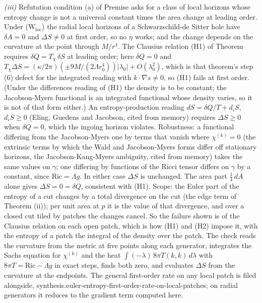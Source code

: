 \emph{(iii)} Refutation condition (a) of Premise  asks for a class of local horizons whose entropy change is not a universal constant times the area change at leading order. Under (W$_{\mathrm{loc}}$) the radial local horizons of a Schwarzschild-de Sitter hole have $\delta A = 0$ and $\Delta S \neq 0$ at first order, so no $\eta$ works; and the change depends on the curvature at the point through $M/r^{4}$. The Clausius relation (H1) of Theorem  requires $\delta Q = T_{\chi}\,\delta S$ at leading order; here $\delta Q = 0$ and $T_{\chi}\Delta S = (\kappa/2\pi)(\pm 9M/(2\Lambda r_{0}^{4}))|\lambda_{0}| + O(\lambda_{0}^{2})$, which is that theorem's step (6) defect for the integrated reading with $k\cdot\nabla s \neq 0$, so (H1) fails at first order. (Under the differences reading of (H1) the density is to be constant; the Jacobson-Myers functional is an integrated functional whose density varies, so it is not of that form either.) An entropy-production reading $dS = \delta Q/T + d_{i}S$, $d_{i}S \ge 0$ (Eling, Guedens and Jacobson, cited from memory) requires $\Delta S \ge 0$ when $\delta Q = 0$, which the ingoing horizon violates. Robustness: a functional differing from the Jacobson-Myers one by terms that vanish where $\chi^{(k)} = 0$ (the extrinsic terms by which the Wald and Jacobson-Myers forms differ off stationary horizons, the Jacobson-Kang-Myers ambiguity, cited from memory) takes the same values on $\gamma$; one differing by functions of the Ricci tensor differs on $\gamma$ by a constant, since $\mathrm{Ric} = \Lambda g$. In either case $\Delta S$ is unchanged. The area part $\tfrac14\,dA$ alone gives $\Delta S = 0 = \delta Q$, consistent with (H1). Scope: the Euler part of the entropy of a cut changes by a total divergence on the cut (the edge term of Theorem (ii)); per unit area at $p$ it is the value of that divergence, and over a closed cut tiled by patches the changes cancel. So the failure shown is of the Clausius relation on each open patch, which is how (H1) and (H2) impose it, with the entropy of a patch the integral of the density over the patch. The check reads the curvature from the metric at five points along each generator, integrates the Sachs equation for $\chi^{(k)}$ and the heat $\int(-\lambda)\,8\pi T(k,k)\,d\lambda$ with $8\pi T = \mathrm{Ric} - \Lambda g$ in exact steps, finds both zero, and evaluates $\Delta S$ from the curvature at the endpoints. The general first-order rate on any local patch is filed alongside, synthesis.euler-entropy-first-order-rate-on-local-patches; on radial generators it reduces to the gradient term computed here.

